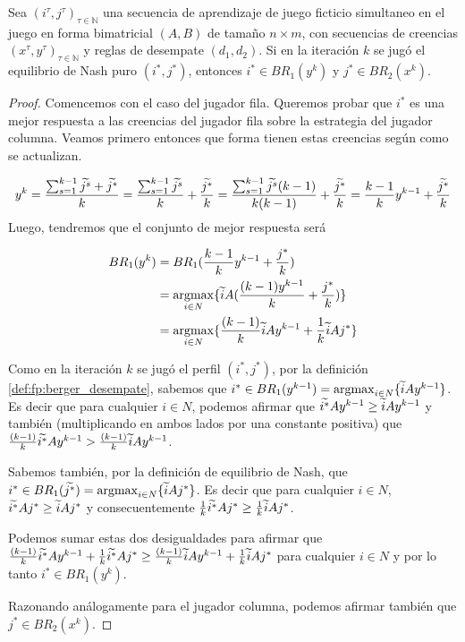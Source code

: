 \begin{lemma}
    Sea $(i^\tau, j^\tau)_{\tau \in \mathbb{N}}$ una secuencia de aprendizaje de juego ficticio simultaneo en el juego en forma bimatricial $(A, B)$ de tamaño $n \times m$, con secuencias de creencias $(x^\tau, y^\tau)_{\tau \in \mathbb{N}}$ y reglas de desempate $(d_1, d_2)$. Si en la iteración $k$ se jugó el equilibrio de Nash puro $(i^*, j^*)$, entonces $i^* \in BR_1(y^{k})$ y $j^* \in BR_2(x^{k})$.
\end{lemma}
\begin{proof}

    Comencemos con el caso del jugador fila. Queremos probar que $i^*$ es una mejor respuesta a las creencias del jugador fila sobre la estrategia del jugador columna. Veamos primero entonces que forma tienen estas creencias según como se actualizan.
    
    \[
        y^k = \frac{\sum_{s=1}^{k-1}{\widetilde{j^s}} + \widetilde{j^*}}{k}
            = \frac{\sum_{s=1}^{k-1}{\widetilde{j^s}}}{k} + \frac{\widetilde{j^*}}{k}
            = \frac{\sum_{s=1}^{k-1}{\widetilde{j^s}}(k-1)}{k(k-1)} + \frac{\widetilde{j^*}}{k}
            = \frac{k - 1}{k} y^{k-1} + \frac{\widetilde{j^*}}{k}
    \]
    Luego, tendremos que el conjunto de mejor respuesta será
    
    \begin{align*}
        BR_1(y^k) &= BR_1(\frac{k - 1}{k} y^{k-1} + \frac{j^*}{k}) \\
        &= \operatorname*{argmax}_{i \in N} \{\widetilde{i} A(\frac{(k - 1)y^{k-1}}{k} + \frac{j^*}{k})\}\\
        &= \operatorname*{argmax}_{i \in N} \{\frac{(k - 1)}{k}\widetilde{i} Ay^{k-1} + \frac{1}{k}\widetilde{i} Aj^*\}
    \end{align*}

    Como en la iteración $k$ se jugó el perfil $(i^*, j^*)$, por la definición \ref{def:fp:berger_desempate}, sabemos que $i^* \in BR_1(y^{k-1}) = \operatorname*{argmax}_{i \in N}\{\widetilde{i}Ay^{k-1}\}$. Es decir que para cualquier $i \in N$, podemos afirmar que $\widetilde{i^*}Ay^{k-1} \geq \widetilde{i}Ay^{k-1}$ y también (multiplicando en ambos lados por una constante positiva) que $\frac{(k - 1)}{k}\widetilde{i^*}Ay^{k-1} > \frac{(k - 1)}{k}\widetilde{i}Ay^{k-1}$.

    Sabemos también, por la definición de equilibrio de Nash, que $i^* \in BR_1(\widetilde{j^*}) = \operatorname*{argmax}_{i \in N}\{\widetilde{i}Aj^*\}$. Es decir que para cualquier $i \in N$, $\widetilde{i^*}Aj^* \geq \widetilde{i}Aj^*$ y consecuentemente $\frac{1}{k}\widetilde{i^*}Aj^* \geq \frac{1}{k}\widetilde{i}Aj^*$.

    Podemos sumar estas dos desigualdades para afirmar que $\frac{(k - 1)}{k}\widetilde{i^*}Ay^{k-1} + \frac{1}{k}\widetilde{i^*}Aj^* \geq \frac{(k - 1)}{k}\widetilde{i}Ay^{k-1} + \frac{1}{k}\widetilde{i}Aj^*$ para cualquier $i \in N$ y por lo tanto $i^* \in BR_1(y^{k})$.

    Razonando análogamente para el jugador columna, podemos afirmar también que $j^* \in BR_2(x^{k})$.
    
\end{proof}

